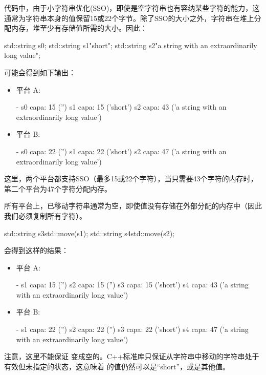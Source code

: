 代码中，由于小字符串优化(SSO)，即使是空字符串也有容纳某些字符的能力，这通常为字符串本身的值保留15或22个字节。除了SSO的大小之外，字符串在堆上分配内存，堆至少有存储值所需的大小。因此：

\begin{cppcode}
std::string s0;
std::string s1{"short"};
std::string s2{"a string with an extraordinarily long value"};
\end{cppcode}

可能会得到如下输出：

\begin{itemize}
	\item 平台 A:
	\begin{outputcode}
- s0 capa: 15 ('')
s1 capa: 15 ('short')
s2 capa: 43 ('a string with an extraordinarily long value')
	\end{outputcode}
	\item 平台 B:
	\begin{outputcode}
- s0 capa: 22 ('')
s1 capa: 22 ('short')
s2 capa: 47 ('a string with an extraordinarily long value')
	\end{outputcode}
\end{itemize}

这里，两个平台都支持SSO（最多15或22个字符），当只需要43个字符的内存时，第二个平台为47个字符分配内存。

所有平台上，已移动字符串通常为空，即使值没有存储在外部分配的内存中（因此我们必须复制所有字符）。

\begin{cppcode}
std::string s3{std::move(s1)};
std::string s4{std::move(s2)};
\end{cppcode}

会得到这样的结果：

\begin{itemize}
	\item 平台 A:
	\begin{outputcode}
- s1 capa: 15 ('')
s2 capa: 15 ('')
s3 capa: 15 ('short')
s4 capa: 43 ('a string with an extraordinarily long value')
	\end{outputcode}
	\item 平台 B:
	\begin{outputcode}
- s1 capa: 22 ('')
s2 capa: 22 ('')
s3 capa: 22 ('short')
s4 capa: 47 ('a string with an extraordinarily long value')
	\end{outputcode}
\end{itemize}

注意，这里不能保证  变成空的。C++标准库只保证从字符串中移动的字符串处于有效但未指定的状态，这意味着  的值仍然可以是“short”，或是其他值。

